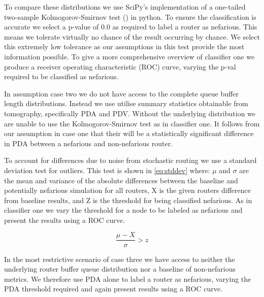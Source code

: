 To compare these distributions we use SciPy's implementation of a one-tailed two-sample Kolmogorov-Smirnov test (\cite{chakravarti_handbook_1967}) in python. To ensure the classification is accurate we select a p-value of 0.0 as required to label a router as nefarious. This means we tolerate virtually no chance of the result occurring by chance. We select this extremely low tolerance as our assumptions in this test provide the most information possible. To give a more comprehensive overview of classifier one we produce a receiver operating characteristic (ROC) curve, varying the p-val required to be classified as nefarious.\par
In assumption case two we do not have access to the complete queue buffer length distributions. Instead we use utilise summary statistics obtainable from tomography, specifically PDA and PDV. Without the underlying distribution we are unable to use the Kolmogorov-Smirnov test as in classifier one. It follows from our assumption in case one that their will be a statistically significant difference in PDA between a nefarious and non-nefarious router.\par
To account for differences due to noise from stochastic routing we use a standard deviation test for outliers. This test is shown in \cref{eq:stddev} where: $\mu$ and $\sigma$ are the mean and variance of the absolute differences between the baseline and potentially nefarious simulation for all routers, X is the given routers difference from baseline results, and Z is the threshold for being classified nefarious. As in classifier one we vary the threshold for a node to be labeled as nefarious and present the results using a ROC curve.\par
  
  \begin{equation}
  \label{eq:stddev}
      \frac{\mu-X}{\sigma}>z
  \end{equation}
  
In the most restrictive scenario of case three we have access to neither the underlying router buffer queue distribution nor a baseline of non-nefarious metrics. We therefore use PDA alone to label a router as nefarious, varying the PDA threshold required and again present results using a ROC curve.\par
  
